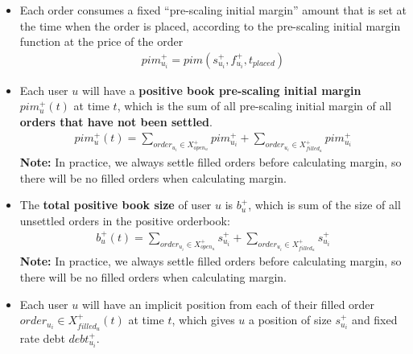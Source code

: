 \documentclass{article}%
\begin{document}
\begin{itemize}
        \begin{align*}
            \sum_{u} N_u^+ &= N^+\\
            \bigcup_{u} X_{open_{u}}^{+} &= X_{open}^{+}\\
            \bigcup_{u} X_{filled_{u}}^{+} &= X_{filled}^{+}\\
            \bigcup_{u} X_{settled_{u}}^{+} &= X_{settled}^{+}\\
        \end{align*}
    \item Each order consumes a fixed ``pre-scaling initial margin'' amount that is set at the time when the order is placed, according to the pre-scaling initial margin function at the price of the order
        \begin{align*}
            pim_{u_i}^{+} = pim(s_{u_i}^{+}, f_{u_i}^{+}, t_{placed})
        \end{align*}
    \item Each user $u$ will have a \textbf{positive book pre-scaling initial margin} $pim^{+}_{u}(t)$ at time $t$, which is the sum of all pre-scaling initial margin of all \textbf{orders that have not been settled}.
        \begin{align*}
            pim^{+}_{u}(t) = \sum_{order_{u_i} \in X_{open_{u}}^{+}} pim_{u_i}^{+}   +   \sum_{order_{u_i} \in X_{filled_{u}}^{+}} pim_{u_i}^{+}
        \end{align*}
        \textbf{Note:} In practice, we always settle filled orders before calculating margin, so there will be no filled orders when calculating margin.
    \item The \textbf{total positive book size} of user $u$ is $b_{u}^{+}$, which is sum of the size of all unsettled orders in the positive orderbook:
        \begin{align*}
            b^{+}_{u}(t) = \sum_{order_{u_i} \in X_{open_{u}}^{+}} s_{u_i}^{+}   +   \sum_{order_{u_i} \in X_{filled_{u}}^{+}} s_{u_i}^{+}
        \end{align*}
        \textbf{Note:} In practice, we always settle filled orders before calculating margin, so there will be no filled orders when calculating margin.
    \item Each user $u$ will have an implicit position from each of their filled order $order_{u_i}\in X_{filled_{u}}^{+}(t)$ at time $t$, which gives $u$ a position of size $s_{u_i}^{+}$ and fixed rate debt $debt_{u_i}^{+}$. 
\end{itemize}
\end{document}
